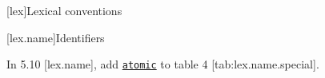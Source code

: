 
[lex]{Lexical conventions}

\setcounter{section}{9}
[lex.name]{Identifiers}

\pnum
In 5.10 {[}lex.name{]}, add \uline{\texttt{atomic}} to table 4
{[}tab:lex.name.special{]}.





